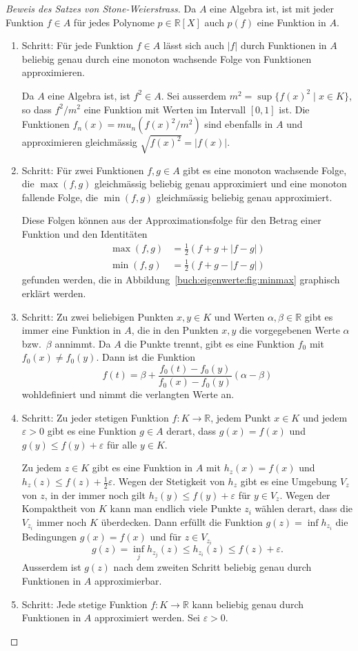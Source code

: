 \begin{proof}[Beweis des Satzes von Stone-Weierstrass]
Da $A$ eine Algebra ist, ist mit jeder Funktion $f\in A$ für jedes Polynome
$p\in\mathbb{R}[X]$ auch $p(f)$ eine Funktion in $A$.
\begin{enumerate}
\item Schritt: Für jede Funktion $f\in A$ lässt sich auch $|f|$ durch
Funktionen in $A$ beliebig genau durch eine monoton wachsende Folge
von Funktionen approximieren.

Da $A$ eine Algebra ist, ist $f^2\in A$.
Sei ausserdem $m^2=\sup \{f(x)^2\;|\;x\in K\}$, so dass $f^2/m^2$ eine Funktion
mit Werten im Intervall $[0,1]$ ist.
Die Funktionen $f_n(x)=mu_n(f(x)^2/m^2)$ sind ebenfalls in $A$ und
approximieren gleichmässig $\sqrt{f(x)^2}=|f(x)|$.
\item Schritt: Für zwei Funktionen $f,g\in A$ gibt es eine monoton wachsende
Folge, die $\max(f,g)$ gleichmässig beliebig genau approximiert
und eine monoton fallende Folge, die $\min(f,g)$ gleichmässig beliebig 
genau approximiert.


Diese Folgen können aus der Approximationsfolge für den Betrag einer
Funktion und den Identitäten
\begin{equation}
\begin{aligned}
\max(f,g) &= \frac12(f+g+|f-g|) \\
\min(f,g) &= \frac12(f+g-|f-g|) 
\end{aligned}
\label{buch:eigenwerte:eqn:minmax}
\end{equation}
gefunden werden, die in Abbildung~\ref{buch:eigenwerte:fig:minmax}
graphisch erklärt werden.
\item Schritt: Zu zwei beliebigen Punkten $x,y\in K$ und Werten
$\alpha,\beta\in\mathbb{R}$ gibt es immer eine Funktion in $A$,
die in den Punkten $x,y$ die vorgegebenen Werte $\alpha$ bzw.~$\beta$
annimmt.
Da $A$ die Punkte trennt, gibt es eine Funktion $f_0$ mit $f_0(x)\ne f_0(y)$.
Dann ist die Funktion
\[
f(t)
=
\beta + \frac{f_0(t)-f_0(y)}{f_0(x)-f_0(y)}(\alpha-\beta)
\]
wohldefiniert und nimmt die verlangten Werte an.
\item Schritt: Zu jeder stetigen Funktion $f\colon K\to\mathbb{R}$, jedem
Punkt $x\in K$ und jedem $\varepsilon>0$ gibt es eine Funktion $g\in A$ derart,
dass $g(x)=f(x)$ und $g(y) \le f(y)+\varepsilon$ für alle $y\in K$.

Zu jedem $z\in K$ gibt es eine Funktion in $A$ mit
$h_z(x)=f(x)$ und $h_z(z) \le f(z)+\frac12\varepsilon$.
Wegen der Stetigkeit von $h_z$ gibt es eine Umgebung $V_z$ von $z$, in der
immer noch gilt $h_z(y)\le f(y)+\varepsilon$ für $y\in V_z$.
Wegen der Kompaktheit von $K$ kann man endlich viele Punkte $z_i$ wählen
derart, dass die $V_{z_i}$ immer noch $K$ überdecken.
Dann erfüllt die Funktion
\(
g(z) = \inf h_{z_i}
\)
die Bedingungen $g(x) = f(x)$ und für $z\in V_{z_i}$
\[
g(z) = \inf_{j} h_{z_j}(z) \le h_{z_i}(z) \le f(z)+\varepsilon.
\]
Ausserdem ist $g(z)$ nach dem zweiten Schritt beliebig genau durch
Funktionen in $A$ approximierbar.
\item Schritt: Jede stetige Funktion $f\colon K\to\mathbb{R}$ kann
beliebig genau durch Funktionen in $A$ approximiert werden.
Sei $\varepsilon > 0$.


\end{enumerate}
\end{proof}
